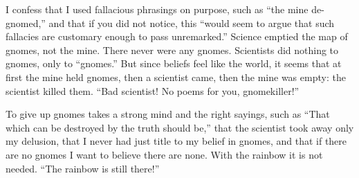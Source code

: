 I confess that I used fallacious phrasings on purpose, such as ``the mine de-gnomed,'' and that if you did not notice, this ``would seem to argue that such fallacies are customary enough to pass unremarked.'' Science emptied the map of gnomes, not the mine. There never were any gnomes. Scientists did nothing to gnomes, only to ``gnomes.'' But since beliefs feel like the world, it seems that at first the mine held gnomes, then a scientist came, then the mine was empty: the scientist killed them. ``Bad scientist! No poems for you, gnomekiller!''

To give up gnomes takes a strong mind and the right sayings, such as ``That which can be destroyed by the truth should be,'' that the scientist took away only my delusion, that I never had just title to my belief in gnomes, and that if there are no gnomes I want to believe there are none. With the rainbow it is not needed. ``The rainbow is still there!''
